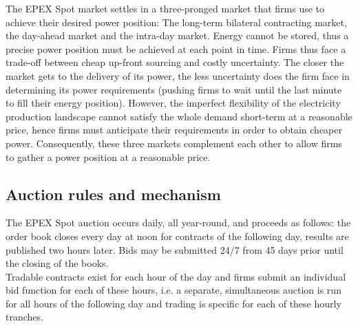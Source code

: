 
The EPEX Spot market settles in a three-pronged market that firms use to achieve their desired power position: The long-term bilateral contracting market, the day-ahead market and the intra-day market. Energy cannot be stored, thus a precise power position must be achieved at each point in time. Firms thus face a trade-off between cheap up-front sourcing and costly uncertainty. The closer the market gets to the delivery of its power, the less uncertainty does the firm face in determining its power requirements (pushing firms to wait until the last minute to fill their energy position). However, the imperfect flexibility of the electricity production landscape cannot satisfy the whole demand short-term at a reasonable price, hence firms must anticipate their requirements in order to obtain cheaper power. Consequently, these three markets complement each other to allow firms to gather a power position at a reasonable price. 


\subsection{Auction rules and mechanism}
\label{epexrules}
The EPEX Spot auction occurs daily, all year-round, and proceeds as follows: the order book closes every day at noon for contracts of the following day, results are published two hours later. Bids may be submitted 24/7 from 45 days prior until the closing of the books. \\

Tradable contracts exist for each hour of the day and firms submit an individual bid function for each of these hours, i.e. a separate, simultaneous auction is run for all hours of the following day and trading is specific for each of these hourly tranches.  \\

